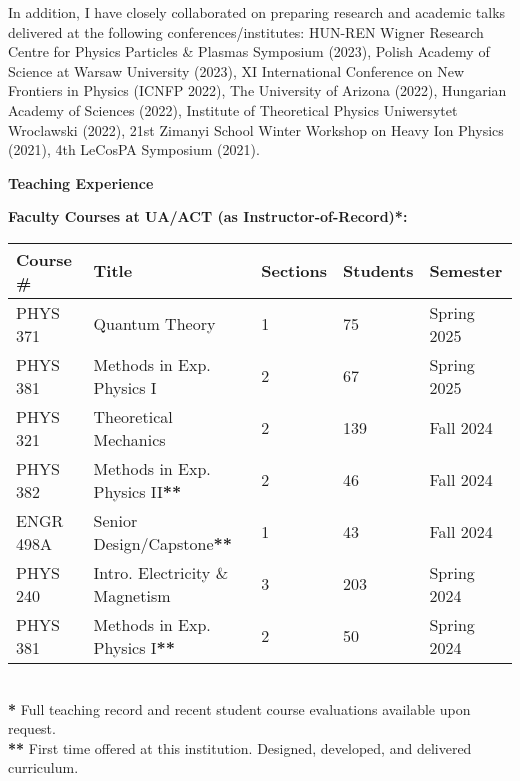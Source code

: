 \documentclass[11pt]{article}
\begin{document}
\noindent In addition, I have closely collaborated on preparing research and academic talks delivered at the following conferences/institutes: HUN-REN Wigner Research Centre for Physics Particles \& Plasmas Symposium (2023), Polish Academy of Science at Warsaw University (2023), XI International Conference on New Frontiers in Physics (ICNFP 2022), The University of Arizona (2022), Hungarian Academy of Sciences (2022), Institute of Theoretical Physics Uniwersytet Wroclawski (2022), 21st Zimanyi School Winter Workshop on Heavy Ion Physics (2021), 4th LeCosPA Symposium (2021).

\medskip

{\Large\textbf{Teaching Experience}}

\textbf{Faculty Courses at UA/ACT (as Instructor-of-Record)*:}\\
{\normalsize
\begin{tabular}{@{}p{2.5cm} p{6.0cm} p{2.0cm} p{2.0cm} p{3.0cm}@{}}
    \toprule
    \textbf{Course \#} & \textbf{Title} & \textbf{Sections} & \textbf{Students} & \textbf{Semester} \\
    \midrule
    PHYS 371   & Quantum Theory                    & 1 & 75  & Spring 2025 \\
    PHYS 381   & Methods in Exp. Physics I         & 2 & 67  & Spring 2025 \\
    PHYS 321   & Theoretical Mechanics             & 2 & 139 & Fall 2024 \\
    PHYS 382   & Methods in Exp. Physics II\textbf{**}       & 2 & 46  & Fall 2024 \\
    ENGR 498A  & Senior Design/Capstone\textbf{**}           & 1 & 43  & Fall 2024 \\
    PHYS 240   & Intro. Electricity \& Magnetism    & 3 & 203 & Spring 2024 \\
    PHYS 381   & Methods in Exp. Physics I\textbf{**}        & 2 & 50  & Spring 2024 \\
    \bottomrule
\end{tabular}
}\\[0.0em]

\textbf{*} Full teaching record and recent student course evaluations available upon request.\\[0.0em]
\textbf{**} First time offered at this institution. Designed, developed, and delivered curriculum.
\end{document}
